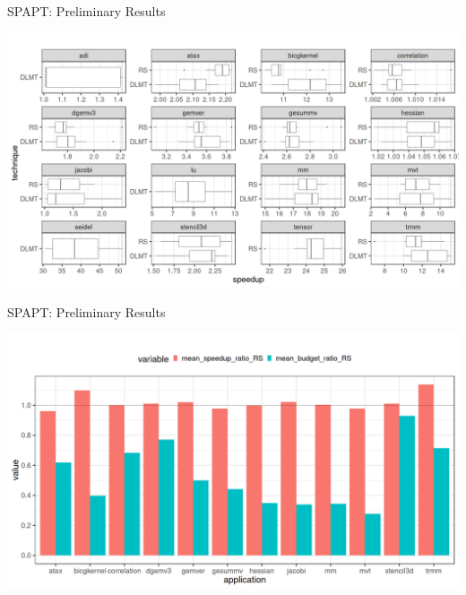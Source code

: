 \documentclass[10pt, compress, aspectratio=169, xcolor={table,usenames,dvipsnames}]{beamer}
\begin{document}
\begin{frame}[label={sec:org96507fa}]{SPAPT: Preliminary Results}
\begin{center}
\begin{center}
\includegraphics[width=.86\linewidth]{../img/preliminary_spapt.png}
\end{center}
\end{center}
\end{frame}
\begin{frame}[label={sec:orge132d1d}]{SPAPT: Preliminary Results}
\begin{center}
\begin{center}
\includegraphics[width=.89\linewidth]{../img/preliminary_spapt_ratios.png}
\end{center}
\end{center}
\end{frame}
\end{document}
